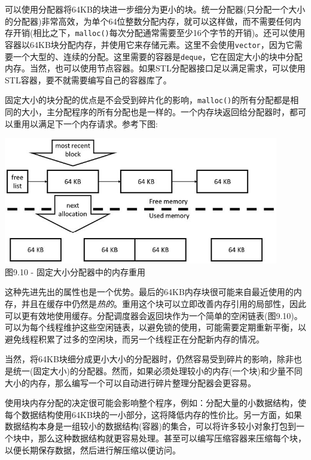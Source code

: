可以使用分配器将64KB的块进一步细分为更小的块。统一分配器(只分配一个大小的分配器)非常高效，为单个64位整数分配内存，就可以这样做，而不需要任何内存开销(相比之下，\texttt{malloc()}每次分配通常需要至少16个字节的开销)。还可以使用容器以64KB块分配内存，并使用它来存储元素。这里不会使用\texttt{vector}，因为它需要一个大型的、连续的分配。这里需要的容器是\texttt{deque}，它在固定大小的块中分配内存。当然，也可以使用节点容器。如果STL分配器接口足以满足需求，可以使用STL容器，要不就需要编写自己的容器库了。

固定大小的块分配的优点是不会受到碎片化的影响，\texttt{malloc()}的所有分配都是相同的大小，主分配程序的所有分配也是一样的。一个内存块返回给分配器时，都可以重用以满足下一个内存请求。参考下图:

\begin{center}
\includegraphics[width=0.9\textwidth]{content/3/chapter9/images/10.jpg}\\
图9.10 - 固定大小分配器中的内存重用
\end{center}

这种先进先出的属性也是一个优势。最后的64KB内存块很可能来自最近使用的内存，并且在缓存中仍然是\textit{热的}。重用这个块可以立即改善内存引用的局部性，因此可以更有效地使用缓存。分配调度器会返回块作为一个简单的空闲链表(图9.10)。可以为每个线程维护这些空闲链表，以避免锁的使用，可能需要定期重新平衡，以避免线程积累了过多的空闲块，而另一个线程正在分配新内存的情况。

当然，将64KB块细分成更小大小的分配器时，仍然容易受到碎片的影响，除非也是统一(固定大小)的分配器。然而，如果必须处理较小的内存(一个块)和少量不同大小的内存，那么编写一个可以自动进行碎片整理分配器会更容易。 

使用块内存分配的决定很可能会影响整个程序，例如：分配大量的小数据结构，使每个数据结构使用64KB块的一小部分，这将降低内存的性价比。另一方面，如果数据结构本身是一组较小的数据结构(容器)的集合，可以将许多较小对象打包到一个块中，那么这种数据结构就更容易处理。甚至可以编写压缩容器来压缩每个块，以便长期保存数据，然后进行解压缩以便访问。 

